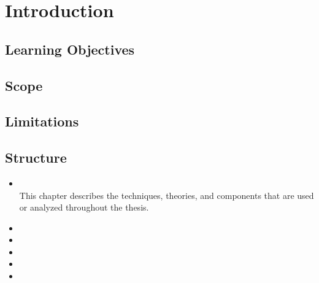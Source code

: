 \chapter{Introduction}
\section{Learning Objectives}

\section{Scope}

\section{Limitations}

\section{Structure}

\begin{itemize}
	\item {}\\
	This chapter describes the techniques, theories, and components that are used or analyzed throughout the thesis.
	\item {}%
	\item {}%
	\item {}%
	\item {}%
	\item {}%
\end{itemize}